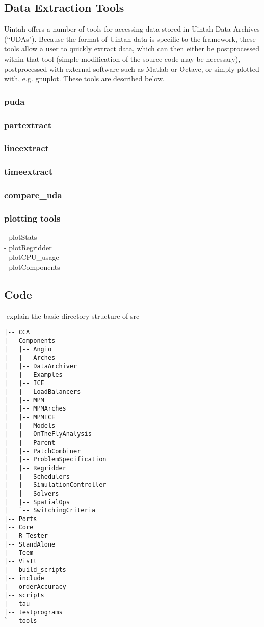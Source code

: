 \subsection{Data Extraction Tools}

Uintah offers a number of tools for accessing data stored in Uintah Data
Archives (``UDAs").  Because the format of Uintah data is specific to the 
framework, these tools allow a user to quickly extract data, which can then
either be postprocessed within that tool (simple modification of the source
code may be necessary), postprocessed with external software such as
Matlab or Octave, or simply plotted with, e.g. gnuplot.  These tools
are described below.

\subsubsection{puda}

\subsubsection{partextract}

\subsubsection{lineextract}

\subsubsection{timeextract}

\subsubsection{compare\_uda}

\subsubsection{plotting tools}
- plotStats\\
- plotRegridder \\
- plotCPU\_usage \\
- plotComponents

\subsection{Code}
-explain the basic directory structure of src
\begin{Verbatim}[fontsize=\footnotesize]
|-- CCA
|-- Components
|   |-- Angio
|   |-- Arches
|   |-- DataArchiver
|   |-- Examples
|   |-- ICE
|   |-- LoadBalancers
|   |-- MPM
|   |-- MPMArches
|   |-- MPMICE
|   |-- Models
|   |-- OnTheFlyAnalysis
|   |-- Parent
|   |-- PatchCombiner
|   |-- ProblemSpecification
|   |-- Regridder
|   |-- Schedulers
|   |-- SimulationController
|   |-- Solvers
|   |-- SpatialOps
|   `-- SwitchingCriteria
|-- Ports
|-- Core
|-- R_Tester
|-- StandAlone
|-- Teem
|-- VisIt
|-- build_scripts
|-- include
|-- orderAccuracy
|-- scripts
|-- tau
|-- testprograms
`-- tools
\end{Verbatim}
